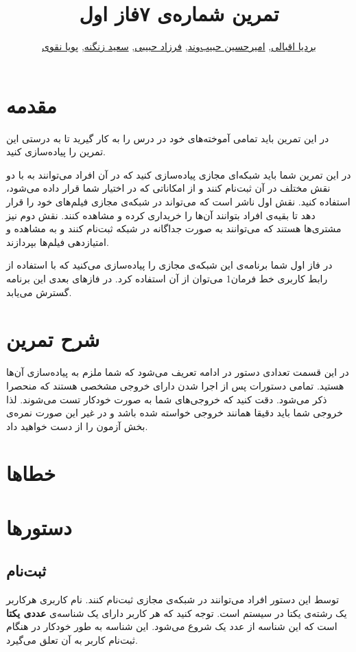 \documentclass{utap}
\title{تمرین شماره‌ی ۷\normalsize\qquad فاز اول}
\author{%
	\href{mailto:bardia.eghbali@gmail.com?subject=[AP\%20S98\%20A7]\%20}{بردیا اقبالی},
	\href{mailto:ahhabibvand@gmail.com?subject=[AP\%20S98\%20A7]\%20}{امیرحسین حبیب‌وند},
	\href{mailto:farzadhabibii98@gmail.com?subject=[AP\%20S98\%20A7]\%20}{فرزاد حبیبی},
	\href{mailto:zangenehsaeed412@gmail.com?subject=[AP\%20S98\%20A7]\%20}{سعید زنگنه},
	\href{mailto:naghavi.pooya@gmail.com?subject=[AP\%20S98\%20A7]\%20}{پویا نقوی}%
}
\begin{document}
	\maketitle
	\section*{مقدمه}
		در این تمرین باید تمامی آموختەهای خود در درس را به کار گیرید تا به درستی این تمرین را پیادەسازی کنید. 
		
		در این تمرین شما باید شبکه‌ای مجازی پیاده‌سازی کنید که در آن افراد می‌توانند به با دو نقش مختلف در آن ثبت‌نام کنند و از امکاناتی که در اختیار شما قرار داده می‌شود، استفاده کنید. نقش اول ناشر است که می‌تواند در شبکه‌ی مجازی فیلم‌های خود را قرار دهد تا بقیه‌ی افراد بتوانند آن‌ها را خریداری کرده و مشاهده کنند. نقش دوم نیز مشتری‌ها هستند که می‌توانند به صورت جداگانه در شبکه ثبت‌نام کنند و به مشاهده‌ و امتیازدهی فیلم‌ها بپردازند.
		
		در فاز اول شما برنامەی این شبکه‌ی مجازی را پیادەسازی می‌کنید که با استفاده از رابط‌ کاربری خط فرمان1 می‌توان از آن استفاده کرد. در فازهای بعدی این برنامه گسترش می‌یابد.


	\section{شرح تمرین}
	در این قسمت تعدادی دستور در ادامه تعریف می‌شود که شما ملزم به پیاده‌سازی آن‌ها هستید. تمامی دستورات پس از اجرا شدن دارای خروجی مشخصی هستند که منحصرا ذکر می‌شود. دقت کنید که خروجی‌های شما به صورت خودکار تست می‌شوند. لذا خروجی شما باید دقیقا همانند خروجی خواسته شده باشد و در غیر این صورت نمره‌ی بخش آزمون
	را از دست خواهید داد.

	\section{خطاها}

\section{دستورها}

	\subsection{ثبت‌نام}
		توسط این دستور افراد می‌توانند در شبکه‌ی مجازی ثبت‌نام کنند. نام کاربری هرکاربر یک رشتەی یکتا در سیستم است. 
		توجه کنید که هر کاربر دارای یک شناسه‌ی 
		\textbf{عددی یکتا}
		است که این شناسه از عدد یک شروع می‌شود. این شناسه به طور خودکار در هنگام ثبت‌نام کاربر به آن تعلق می‌گیرد.
		
\end{document}
